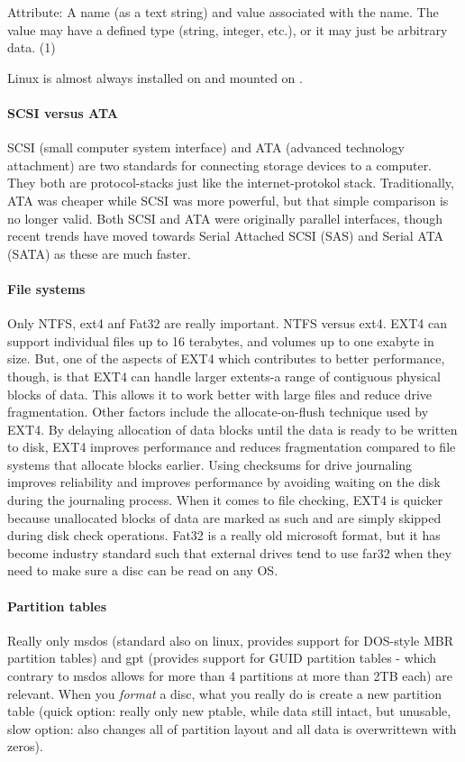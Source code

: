 Attribute: A name (as a text string) and value associated with the name. The value may have a deﬁned type (string, integer, etc.), or it may just be arbitrary data. (1)





Linux is almost always installed on  and mounted on \inlinecode{/}.

\paragraph{SCSI versus ATA} SCSI (small computer system interface) and ATA (advanced technology attachment) are two standards for connecting storage devices to a computer. They both are protocol-stacks just like the internet-protokol stack. Traditionally, ATA was cheaper while SCSI was more powerful, but that simple comparison is no longer valid. Both SCSI and ATA were originally parallel interfaces, though recent trends have moved towards Serial Attached SCSI (SAS) and Serial ATA (SATA) as these are much faster.


\paragraph{File systems} Only NTFS, ext4 anf Fat32 are really important. NTFS versus ext4. EXT4 can support individual files up to 16 terabytes, and volumes up to one exabyte in size. But, one of the aspects of EXT4 which contributes to better performance, though, is that EXT4 can handle larger extents-a range of contiguous physical blocks of data. This allows it to work better with large files and reduce drive fragmentation. Other factors include the allocate-on-flush technique used by EXT4. By delaying allocation of data blocks until the data is ready to be written to disk, EXT4 improves performance and reduces fragmentation compared to file systems that allocate blocks earlier.
Using checksums for drive journaling improves reliability and improves performance by avoiding waiting on the disk during the journaling process. When it comes to file checking, EXT4 is quicker because unallocated blocks of data are marked as such and are simply skipped during disk check operations.
Fat32 is a really old microsoft format, but it has become industry standard such that external drives tend to use far32 when they need to make sure a disc can be read on any OS. 


\paragraph{Partition tables} Really only msdos (standard also on linux, provides support for DOS-style MBR partition tables) and gpt (provides support for GUID partition tables - which contrary to msdos allows for more than 4 partitions at more than 2TB each) are relevant. When you \emph{format} a disc, what you really do is create a new partition table (quick option: really only new ptable, while data still intact, but unusable, slow option: also changes all of partition layout and all data is overwrittewn with zeros). 



